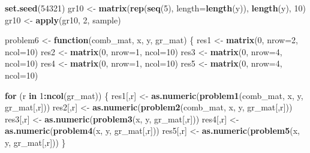 \documentclass[
]{article}
\newenvironment{Shaded}{\begin{snugshade}}{\end{snugshade}}
\newcommand{\AttributeTok}[1]{\textcolor[rgb]{0.13,0.29,0.53}{#1}}
\newcommand{\ControlFlowTok}[1]{\textcolor[rgb]{0.13,0.29,0.53}{\textbf{#1}}}
\newcommand{\DecValTok}[1]{\textcolor[rgb]{0.00,0.00,0.81}{#1}}
\newcommand{\FunctionTok}[1]{\textcolor[rgb]{0.13,0.29,0.53}{\textbf{#1}}}
\newcommand{\NormalTok}[1]{#1}
\newcommand{\OtherTok}[1]{\textcolor[rgb]{0.56,0.35,0.01}{#1}}
\newcommand{\SpecialCharTok}[1]{\textcolor[rgb]{0.81,0.36,0.00}{\textbf{#1}}}
\begin{document}
\begin{Shaded}
\begin{Highlighting}[]
\FunctionTok{set.seed}\NormalTok{(}\DecValTok{54321}\NormalTok{)}
\NormalTok{gr10 }\OtherTok{\textless{}{-}} \FunctionTok{matrix}\NormalTok{(}\FunctionTok{rep}\NormalTok{(}\FunctionTok{seq}\NormalTok{(}\DecValTok{5}\NormalTok{), }\AttributeTok{length=}\FunctionTok{length}\NormalTok{(y)), }\FunctionTok{length}\NormalTok{(y), }\DecValTok{10}\NormalTok{)}
\NormalTok{gr10 }\OtherTok{\textless{}{-}} \FunctionTok{apply}\NormalTok{(gr10, }\DecValTok{2}\NormalTok{, sample)}

\NormalTok{problem6 }\OtherTok{\textless{}{-}} \ControlFlowTok{function}\NormalTok{(comb\_mat, x, y, gr\_mat) \{}
\NormalTok{  res1 }\OtherTok{\textless{}{-}} \FunctionTok{matrix}\NormalTok{(}\DecValTok{0}\NormalTok{, }\AttributeTok{nrow=}\DecValTok{2}\NormalTok{, }\AttributeTok{ncol=}\DecValTok{10}\NormalTok{)}
\NormalTok{  res2 }\OtherTok{\textless{}{-}} \FunctionTok{matrix}\NormalTok{(}\DecValTok{0}\NormalTok{, }\AttributeTok{nrow=}\DecValTok{1}\NormalTok{, }\AttributeTok{ncol=}\DecValTok{10}\NormalTok{)}
\NormalTok{  res3 }\OtherTok{\textless{}{-}} \FunctionTok{matrix}\NormalTok{(}\DecValTok{0}\NormalTok{, }\AttributeTok{nrow=}\DecValTok{4}\NormalTok{, }\AttributeTok{ncol=}\DecValTok{10}\NormalTok{)}
\NormalTok{  res4 }\OtherTok{\textless{}{-}} \FunctionTok{matrix}\NormalTok{(}\DecValTok{0}\NormalTok{, }\AttributeTok{nrow=}\DecValTok{1}\NormalTok{, }\AttributeTok{ncol=}\DecValTok{10}\NormalTok{)}
\NormalTok{  res5 }\OtherTok{\textless{}{-}} \FunctionTok{matrix}\NormalTok{(}\DecValTok{0}\NormalTok{, }\AttributeTok{nrow=}\DecValTok{4}\NormalTok{, }\AttributeTok{ncol=}\DecValTok{10}\NormalTok{)}
  
  \ControlFlowTok{for}\NormalTok{ (r }\ControlFlowTok{in} \DecValTok{1}\SpecialCharTok{:}\FunctionTok{ncol}\NormalTok{(gr\_mat)) \{}
\NormalTok{    res1[,r] }\OtherTok{\textless{}{-}} \FunctionTok{as.numeric}\NormalTok{(}\FunctionTok{problem1}\NormalTok{(comb\_mat, x, y, gr\_mat[,r]))}
\NormalTok{    res2[,r] }\OtherTok{\textless{}{-}} \FunctionTok{as.numeric}\NormalTok{(}\FunctionTok{problem2}\NormalTok{(comb\_mat, x, y, gr\_mat[,r]))}
\NormalTok{    res3[,r] }\OtherTok{\textless{}{-}} \FunctionTok{as.numeric}\NormalTok{(}\FunctionTok{problem3}\NormalTok{(x, y, gr\_mat[,r]))}
\NormalTok{    res4[,r] }\OtherTok{\textless{}{-}} \FunctionTok{as.numeric}\NormalTok{(}\FunctionTok{problem4}\NormalTok{(x, y, gr\_mat[,r]))}
\NormalTok{    res5[,r] }\OtherTok{\textless{}{-}} \FunctionTok{as.numeric}\NormalTok{(}\FunctionTok{problem5}\NormalTok{(x, y, gr\_mat[,r]))}
\NormalTok{  \}}
  

\end{Highlighting}
\end{Shaded}
\end{document}
